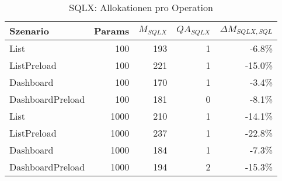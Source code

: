 
\begin{table}[ht]
\centering
\caption{SQLX: Allokationen pro Operation}
\begin{tabular}{lrrrr}
\toprule
Szenario & Params & ${M_{SQLX}}$ & ${QA_{SQLX}}$ & ${\Delta M_{SQLX,SQL}}$ \\
\midrule

	List & 100 & 193 & 1 & -6.8\% \\
	ListPreload & 100 & 221 & 1 & -15.0\% \\
	Dashboard & 100 & 170 & 1 & -3.4\% \\
	DashboardPreload & 100 & 181 & 0 & -8.1\% \\
	List & 1000 & 210 & 1 & -14.1\% \\
	ListPreload & 1000 & 237 & 1 & -22.8\% \\
	Dashboard & 1000 & 184 & 1 & -7.3\% \\
	DashboardPreload & 1000 & 194 & 2 & -15.3\% \\
\bottomrule
\end{tabular}
\label{tab:benchmark_sqlx_allocsperop}
\end{table}
	